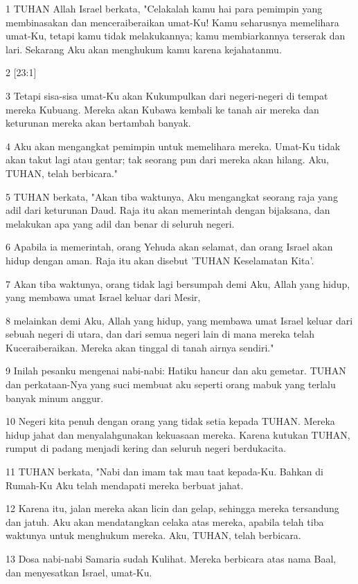 \par 1 TUHAN Allah Israel berkata, "Celakalah kamu hai para pemimpin yang membinasakan dan menceraiberaikan umat-Ku! Kamu seharusnya memelihara umat-Ku, tetapi kamu tidak melakukannya; kamu membiarkannya terserak dan lari. Sekarang Aku akan menghukum kamu karena kejahatanmu.
\par 2 [23:1]
\par 3 Tetapi sisa-sisa umat-Ku akan Kukumpulkan dari negeri-negeri di tempat mereka Kubuang. Mereka akan Kubawa kembali ke tanah air mereka dan keturunan mereka akan bertambah banyak.
\par 4 Aku akan mengangkat pemimpin untuk memelihara mereka. Umat-Ku tidak akan takut lagi atau gentar; tak seorang pun dari mereka akan hilang. Aku, TUHAN, telah berbicara."
\par 5 TUHAN berkata, "Akan tiba waktunya, Aku mengangkat seorang raja yang adil dari keturunan Daud. Raja itu akan memerintah dengan bijaksana, dan melakukan apa yang adil dan benar di seluruh negeri.
\par 6 Apabila ia memerintah, orang Yehuda akan selamat, dan orang Israel akan hidup dengan aman. Raja itu akan disebut 'TUHAN Keselamatan Kita'.
\par 7 Akan tiba waktunya, orang tidak lagi bersumpah demi Aku, Allah yang hidup, yang membawa umat Israel keluar dari Mesir,
\par 8 melainkan demi Aku, Allah yang hidup, yang membawa umat Israel keluar dari sebuah negeri di utara, dan dari semua negeri lain di mana mereka telah Kuceraiberaikan. Mereka akan tinggal di tanah airnya sendiri."
\par 9 Inilah pesanku mengenai nabi-nabi: Hatiku hancur dan aku gemetar. TUHAN dan perkataan-Nya yang suci membuat aku seperti orang mabuk yang terlalu banyak minum anggur.
\par 10 Negeri kita penuh dengan orang yang tidak setia kepada TUHAN. Mereka hidup jahat dan menyalahgunakan kekuasaan mereka. Karena kutukan TUHAN, rumput di padang menjadi kering dan seluruh negeri berdukacita.
\par 11 TUHAN berkata, "Nabi dan imam tak mau taat kepada-Ku. Bahkan di Rumah-Ku Aku telah mendapati mereka berbuat jahat.
\par 12 Karena itu, jalan mereka akan licin dan gelap, sehingga mereka tersandung dan jatuh. Aku akan mendatangkan celaka atas mereka, apabila telah tiba waktunya untuk menghukum mereka. Aku, TUHAN, telah berbicara.
\par 13 Dosa nabi-nabi Samaria sudah Kulihat. Mereka berbicara atas nama Baal, dan menyesatkan Israel, umat-Ku.
